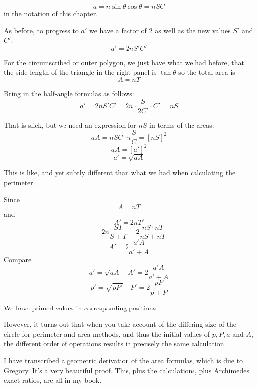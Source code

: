 \documentclass[11pt, oneside]{article}
\begin{document}
\[ a = n \sin \theta \cos \theta = n SC \]
in the notation of this chapter.  

As before, to progress to $a'$ we have a factor of $2$ as well as the new values $S'$ and $C'$:
\[ a' = 2n S'C' \]

For the circumscribed or outer polygon, we just have what we had before, that the side length of the triangle in the right panel is $\tan \theta$ so the total area is
\[ A = nT \]

Bring in the half-angle formulas as follows:
\[ a' = 2n S'C' = 2n \cdot \frac{S}{2C'} \cdot C' = nS \]

That is slick, but we need an expression for $nS$ in terms of the areas:
\[ aA = nSC \cdot n \frac{S}{C} = [nS]^2 \]
\[ aA = [a']^2 \]
\[ a' = \sqrt{aA} \]

This is like, and yet subtly different than what we had when calculating the perimeter.

Since
\[ A = nT \]
and
\[ A' = 2nT' \]
\[ = 2n \frac{ST}{S + T} = 2 \frac{nS \cdot nT}{nS + nT} \]
\[ A' = 2 \frac{a'A}{a' + A} \]
Compare
\[ a' = \sqrt{aA}  \ \ \ \ \  A' = 2 \frac{a'A}{a' + A} \]
\[ p' = \sqrt{pP'}  \ \ \ \ \   P' = 2 \frac{pP}{p + P} \]

We have primed values in corresponding positions.

However, it turns out that when you take account of the differing size of the circle for perimeter and area methods, and thus the initial values of $p,P,a$ and $A$, the different order of operations results in precisely the same calculation.

I have transcribed a geometric derivation of the area formulas, which is due to Gregory.  It's a very beautiful proof.  This, plus the calculations, plus Archimedes exact ratios, are all in my book.
\end{document}

